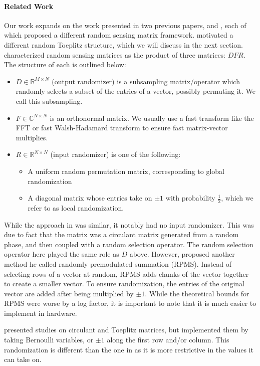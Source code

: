 \paragraph{Related Work}
Our work expands on the work presented in two previous papers, \cite{doetal} and \cite{romberg2009}, each of which proposed a different random sensing matrix framework. \cite{wotao} motivated a different random Toeplitz structure, which we will discuss in the next section. \cite{doetal} characterized random sensing matrices as the product of three matrices: $DFR$. The structure of each is outlined below:

\begin{itemize}
	\item $D\in \mathbb{R}^{M\times N}$ (output randomizer) is a subsampling matrix/operator which randomly selects a subset of the entries of a vector, possibly permuting it. We call this subsampling.
	\item $F\in\mathbb{C}^{N\times N}$ is an orthonormal matrix. We usually use a fast transform like the FFT or fast Walsh-Hadamard transform to ensure fast matrix-vector multiplies.
	\item $R\in\mathbb{R}^{N\times N}$ (input randomizer) is one of the following:
		\begin{itemize}
			\item A uniform random permutation matrix, corresponding to global randomization
			\item A diagonal matrix whose entries take on $\pm 1$ with probability $\tfrac{1}{2}$, which we refer to as local randomization.
		\end{itemize}
\end{itemize}

While the approach in \cite{romberg2009} was similar, it notably had no input randomizer. This was due to fact that the matrix was a circulant matrix generated from a random phase, and then coupled with a random selection operator. The random selection operator here played the same role as $D$ above. However, \cite{romberg2009} proposed another method he called randomly premodulated summation (RPMS). Instead of selecting rows of a vector at random, RPMS adds chunks of the vector together to create a smaller vector. To ensure randomization, the entries of the original vector are added after being multiplied by $\pm 1$. While the theoretical bounds for RPMS were worse by a log factor, it is important to note that it is much easier to implement in hardware.

\cite{wotao} presented studies on circulant and Toeplitz matrices, but implemented them by taking Bernoulli variables, or $\pm1$ along the first row and/or column. This randomization is different than the one in \cite{romberg2009} as it is more restrictive in the values it can take on. 

